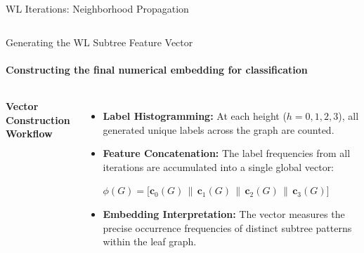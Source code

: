 \documentclass[aspectratio=169, 11pt]{beamer}
\begin{document}
\begin{frame}{WL Iterations: Neighborhood Propagation}
\begin{columns}[T]
        \vspace{0.35cm}
    \end{columns}
\end{frame}

\begin{frame}{Generating the WL Subtree Feature Vector}
    \framesubtitle{Constructing the final numerical embedding for classification \cite{shervashidze2011weisfeiler}}

    \begin{columns}[c]
        \textbf{Vector Construction Workflow}
        \vspace{0.15cm}
        \begin{itemize}\footnotesize
            \item \textbf{Label Histogramming:} At each height ($h = 0, 1, 2, 3$), all generated unique labels across the graph are counted.
            \item \textbf{Feature Concatenation:} The label frequencies from all iterations are accumulated into a single global vector:
            \begin{center}
                \scriptsize $\phi(G) = \big[\mathbf{c}_0(G) \,\|\, \mathbf{c}_1(G) \,\|\, \mathbf{c}_2(G) \,\|\, \mathbf{c}_3(G)\big]$
            \end{center}
            \item \textbf{Embedding Interpretation:} The vector measures the precise occurrence frequencies of distinct subtree patterns within the leaf graph.
        \end{itemize}

        \centering
\end{columns}
\end{frame}
\end{document}
